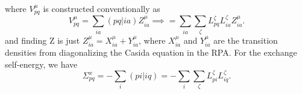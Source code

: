 \documentclass[12pt]{article}
\begin{document}
where $V_{pq}^{\mu}$ is constructed conventionally as
\begin{equation}
    V_{pq}^{\mu} = \sum _{ia} (pq|ia) Z_{ia}^{\mu} \implies = \sum_{ia} \sum _{\zeta} L_{pq}^{\zeta} L_{ia}^{\zeta} Z_{ia}^{\mu}.
\end{equation}
and finding Z is just $Z_{ia}^{\mu} = X_{ia}^{\mu} + Y_{ia}^{\mu}$, where $X_{ia}^{\mu}$ and $Y_{ia}^{\mu}$ are the transition densities from diagonalizing the Casida equation in the RPA.
For the exchange self-energy, we have
\begin{equation}
    \Sigma_{pq}^x = - \sum _{i} (pi|iq) = - \sum _{i} \sum _{\zeta} L_{pi}^{\zeta} L_{iq}^{\zeta}.
\end{equation}
\end{document}
